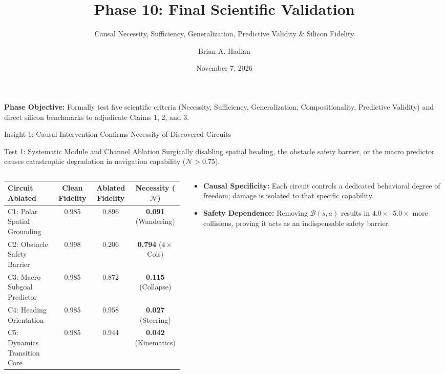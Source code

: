 \documentclass[aspectratio=169, 10pt]{beamer}
\title[Phase 10: Scientific Validation]{Phase 10: Final Scientific Validation}
\subtitle{Causal Necessity, Sufficiency, Generalization, Predictive Validity \& Silicon Fidelity}
\author[Brian A. Hadian]{Brian A. Hadian}
\institute[Advanced Agentic Systems]{Action-Conditioned World Models \& Language Navigation on AMD Kria KR260 FPGA}
\date{November 7, 2026}
\begin{document}
\begin{frame}
  \titlepage
  \centering
  \vspace{-0.4cm}
  \footnotesize
  \textbf{Phase Objective:} Formally test five scientific criteria (Necessity, Sufficiency, Generalization, Compositionality, Predictive Validity) and direct silicon benchmarks to adjudicate Claims 1, 2, and 3.
\end{frame}

\begin{frame}{Insight 1: Causal Intervention Confirms Necessity of Discovered Circuits}
  \begin{block}{Test 1: Systematic Module and Channel Ablation}
    Surgically disabling spatial heading, the obstacle safety barrier, or the macro predictor causes catastrophic degradation in navigation capability ($\mathcal{N} > 0.75$).
  \end{block}
  \vspace{-0.2cm}
  \begin{columns}[T]
    \begin{column}{0.54\textwidth}
      \setlength{\tabcolsep}{2pt}
      \begin{table}
        \centering
        \scriptsize
        \begin{tabular}{lccc}
          \toprule
          \textbf{Circuit Ablated} & \textbf{Clean Fidelity} & \textbf{Ablated Fidelity} & \textbf{Necessity ($\mathcal{N}$)} \\
          \midrule
          C1: Polar Spatial Grounding & 0.985 & 0.896 & \textbf{0.091} (Wandering) \\
          C2: Obstacle Safety Barrier & 0.998 & 0.206 & \textbf{0.794} ($4\times$ Cols) \\
          C3: Macro Subgoal Predictor & 0.985 & 0.872 & \textbf{0.115} (Collapse) \\
          C4: Heading Orientation & 0.985 & 0.958 & \textbf{0.027} (Steering) \\
          C5: Dynamics Transition Core & 0.985 & 0.944 & \textbf{0.042} (Kinematics) \\
          \bottomrule
        \end{tabular}
      \end{table}
    \end{column}
    \begin{column}{0.44\textwidth}
      \begin{itemize}
        \item \textbf{Causal Specificity:} Each circuit controls a dedicated behavioral degree of freedom; damage is isolated to that specific capability.
        \item \textbf{Safety Dependence:} Removing $\mathcal{B}(s, a)$ results in $4.0\times\text{--}5.0\times$ more collisions, proving it acts as an indispensable safety barrier.
      \end{itemize}
    \end{column}
  \end{columns}
\end{frame}
\end{document}
